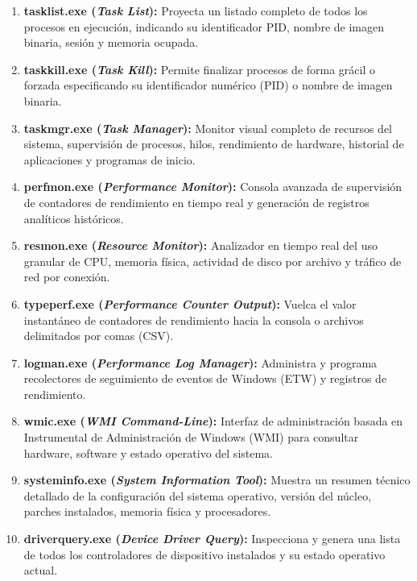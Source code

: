 \documentclass[12pt]{article}
\begin{document}
\begin{enumerate}[leftmargin=*, noitemsep, topsep=1pt]
    \item \textbf{tasklist.exe (\textit{Task List}):} Proyecta un listado completo de todos los procesos en ejecución, indicando su identificador PID, nombre de imagen binaria, sesión y memoria ocupada.
    \item \textbf{taskkill.exe (\textit{Task Kill}):} Permite finalizar procesos de forma grácil o forzada especificando su identificador numérico (PID) o nombre de imagen binaria.
    \item \textbf{taskmgr.exe (\textit{Task Manager}):} Monitor visual completo de recursos del sistema, supervisión de procesos, hilos, rendimiento de hardware, historial de aplicaciones y programas de inicio.
    \item \textbf{perfmon.exe (\textit{Performance Monitor}):} Consola avanzada de supervisión de contadores de rendimiento en tiempo real y generación de registros analíticos históricos.
    \item \textbf{resmon.exe (\textit{Resource Monitor}):} Analizador en tiempo real del uso granular de CPU, memoria física, actividad de disco por archivo y tráfico de red por conexión.
    \item \textbf{typeperf.exe (\textit{Performance Counter Output}):} Vuelca el valor instantáneo de contadores de rendimiento hacia la consola o archivos delimitados por comas (CSV).
    \item \textbf{logman.exe (\textit{Performance Log Manager}):} Administra y programa recolectores de seguimiento de eventos de Windows (ETW) y registros de rendimiento.
    \item \textbf{wmic.exe (\textit{WMI Command-Line}):} Interfaz de administración basada en Instrumental de Administración de Windows (WMI) para consultar hardware, software y estado operativo del sistema.
    \item \textbf{systeminfo.exe (\textit{System Information Tool}):} Muestra un resumen técnico detallado de la configuración del sistema operativo, versión del núcleo, parches instalados, memoria física y procesadores.
    \item \textbf{driverquery.exe (\textit{Device Driver Query}):} Inspecciona y genera una lista de todos los controladores de dispositivo instalados y su estado operativo actual.
\end{enumerate}
\end{document}
